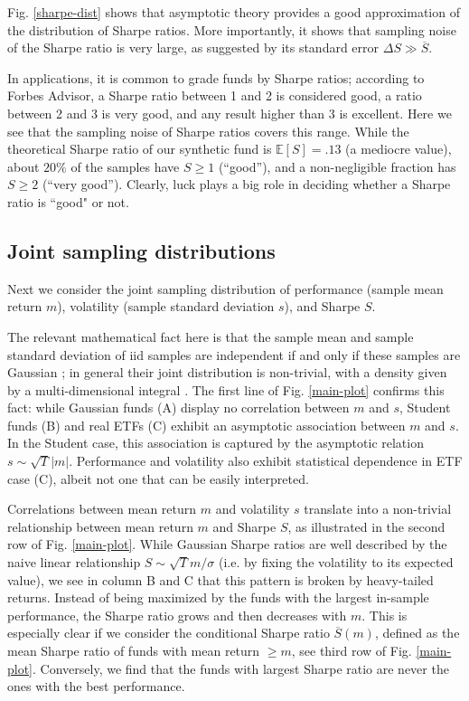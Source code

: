 \documentclass[
reprint,
amsmath,amssymb,
aps,
]{revtex4-2}
\begin{document}
Fig. \ref{sharpe-dist} shows that asymptotic theory provides a good approximation of the distribution of Sharpe ratios.
More importantly, it shows that sampling noise of the Sharpe ratio is very large, as suggested by its standard error $\Delta S \gg \overline{S}$.

In applications, it is common to grade funds by Sharpe ratios; according to Forbes Advisor, a Sharpe ratio between 1 and 2 is considered good, a ratio between 2 and 3 is very good, and any result higher than 3 is excellent. 
Here we see that the sampling noise of Sharpe ratios covers this range. While the theoretical Sharpe ratio of our synthetic fund is $\mathbb{E}[S] = .13$ (a mediocre value), about $20\%$ of the samples have $S \geq 1$ (``good''), and a non-negligible fraction has $S \geq 2$ (``very good''). 
Clearly, luck plays a big role in deciding whether a Sharpe ratio is ``good" or not. 

\subsection{Joint sampling distributions}

Next we consider the joint sampling distribution of performance (sample mean return $m$), volatility (sample standard deviation $s$), and Sharpe $S$. 

The relevant mathematical fact here is that the sample mean and sample standard deviation of iid samples are independent if and only if these samples are Gaussian \cite{gearyDistribution1936}; in general their joint distribution is non-trivial, with a density given by a multi-dimensional integral \cite{springerJoint1953}. 
The first line of Fig. \ref{main-plot} confirms this fact: while Gaussian funds (A) display no correlation between $m$ and $s$, Student funds (B) and real ETFs (C) exhibit an asymptotic association between $m$ and $s$. 
In the Student case, this association is captured by the asymptotic relation $s \sim \sqrt{T}\vert m\vert$. 
Performance and volatility also exhibit statistical dependence in ETF case (C), albeit not one that can be easily interpreted.  

Correlations between mean return $m$ and volatility $s$ translate into a non-trivial relationship between mean return $m$ and Sharpe $S$, as illustrated in the second row of Fig. \ref{main-plot}. 
While Gaussian Sharpe ratios are well described by the naive linear relationship $S \sim \sqrt{T}m/\sigma$ (i.e. by fixing the volatility to its expected value), we see in column B and C that this pattern is broken by heavy-tailed returns.
Instead of being maximized by the funds with the largest in-sample performance, the Sharpe ratio grows and then decreases with $m$. 
This is especially clear if we consider the conditional Sharpe ratio $\overline{S}(m)$, defined as the mean Sharpe ratio of funds with mean return $\geq m$, see third row of Fig. \ref{main-plot}.
Conversely, we find that the funds with largest Sharpe ratio are never the ones with the best performance. 
\end{document}
